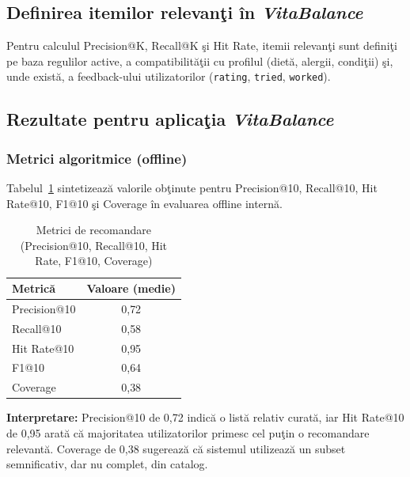 \documentclass[12pt,a4paper]{article}
\begin{document}
\subsection*{Definirea itemilor relevan\c{t}i \^{i}n \textit{VitaBalance}}

Pentru calculul Precision@K, Recall@K \c{s}i Hit Rate, itemii relevan\c{t}i sunt defini\c{t}i pe baza regulilor active, a compatibilit\u{a}\c{t}ii cu profilul (diet\u{a}, alergii, condi\c{t}ii) \c{s}i, unde exist\u{a}, a feedback-ului utilizatorilor (\texttt{rating}, \texttt{tried}, \texttt{worked}).

\subsection*{Rezultate pentru aplica\c{t}ia \textit{VitaBalance}}

\subsubsection*{Metrici algoritmice (offline)}

Tabelul~\ref{tab:rec-metrics} sintetizeaz\u{a} valorile ob\c{t}inute pentru Precision@10, Recall@10, Hit Rate@10, F1@10 \c{s}i Coverage \^{i}n evaluarea offline intern\u{a}.

\begin{table}[h!]
  \centering
  \caption{Metrici de recomandare (Precision@10, Recall@10, Hit Rate, F1@10, Coverage)}
  \label{tab:rec-metrics}
  \vspace{4pt}
  \small
  \begin{tabular}{@{}lc@{}}
    \toprule
    \textbf{Metric\u{a}} & \textbf{Valoare (medie)} \\
    \midrule
    Precision@10 & 0{,}72 \\
    Recall@10    & 0{,}58 \\
    Hit Rate@10  & 0{,}95 \\
    F1@10        & 0{,}64 \\
    Coverage     & 0{,}38 \\
    \bottomrule
  \end{tabular}
\end{table}

\textbf{Interpretare:} Precision@10 de 0{,}72 indic\u{a} o list\u{a} relativ curat\u{a}, iar Hit Rate@10 de 0{,}95 arat\u{a} c\u{a} majoritatea utilizatorilor primesc cel pu\c{t}in o recomandare relevant\u{a}. Coverage de 0{,}38 sugereaz\u{a} c\u{a} sistemul utilizeaz\u{a} un subset semnificativ, dar nu complet, din catalog.
\end{document}

